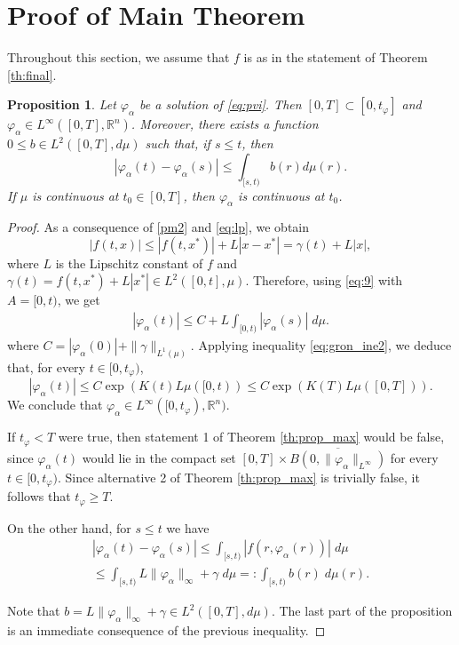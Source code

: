 \documentclass[a4paper,11pt]{amsart}
\theoremstyle{plain}
\newtheorem{prop}[thm]{Proposition}
\theoremstyle{remark}
\newcommand{\rr}{\mathbb{R}}
\numberwithin{equation}{section}
\begin{document}
 \section{Proof of Main Theorem} \label{sec:main_th}

Throughout this section, we assume that $f$ is as in the statement of Theorem \ref{th:final}.
  
\begin{prop}\label{corolario_continuidad}
     Let $\varphi_\alpha$ be a solution of \eqref{eq:pvi}. 
		Then $[0,T]\subset [0,t_{\varphi}]$ and $\varphi_{\alpha}\in L^\infty([0,T],\rr^n)$. Moreover, there exists a function $0\leq b\in L^2([0,T],d\mu)$ such that, if $s\leq t$, then
    \begin{equation*}\label{acotación}
        \left| \varphi_\alpha(t)-\varphi_\alpha(s)\right|\leq \int_{[s,t)}b(r)d\mu(r).
    \end{equation*}
If $\mu$ is continuous at $t_0\in [0,T]$, then $\varphi_\alpha$ is continuous at $t_0$.
\end{prop}

\begin{proof}
As a consequence of \ref{pm2} and \ref{eq:lp}, we obtain
\begin{equation}\label{eq:cota_f}
 |f(t,x)|\leq |f(t,x^*)|+L|x-x^*|=\gamma(t)+L|x|,
\end{equation}
where $L$ is the Lipschitz constant of $f$ and $\gamma(t)=f(t,x^*)+L|x^*|\in L^2([0,t],\mu)$. Therefore, using \eqref{eq:9} with $A=[0,t)$, we get
\begin{equation*}
\begin{split}
 	|\varphi_{\alpha}(t)|
     \leq C+L\int_{[0,t)}| \varphi_{\alpha}(s)|\;d\mu.
\end{split}
\end{equation*}
where $C=|\varphi_{\alpha}(0)|+\|\gamma\|_{L^1(\mu)}$. Applying inequality \eqref{eq:gron_ine2}, we deduce that, for every $t\in[0,t_{\varphi})$,
 \begin{equation*}
 	|\varphi_{\alpha}(t)|
	\leq C\exp\left(K(t)L\mu([0,t) \right)\leq C\exp\left(K(T)L\mu([0,T]) \right).
 \end{equation*}
We conclude that $\varphi_{\alpha}\in L^\infty([0,t_{\varphi}),\rr^n)$.

If $t_{\varphi}<T$ were true, then statement 1 of Theorem \ref{th:prop_max} would be false, since $\varphi_{\alpha}(t)$ would lie in the compact set $[0,T]\times \overline{B(0,\|\varphi_{\alpha}\|_{L^\infty})}$ for every $t\in[0,t_\varphi)$. Since alternative 2 of Theorem \ref{th:prop_max} is trivially false, it follows that $t_\varphi\geq T$.

On the other hand, for $s\leq t$ we have
  	\begin{multline*}
  		|\varphi_\alpha(t)-\varphi_\alpha(s)|\leq \int_{[s,t)}|f(r,\varphi_\alpha(r))|\;d\mu \\ \leq  \int_{[s,t)}L\|\varphi_\alpha\|_{\infty} + \gamma\;d\mu=:\int_{[s,t)}b(r)\;d \mu(r).
  	\end{multline*}

Note that $b=L\|\varphi_\alpha\|_{\infty} + \gamma\in L^2([0,T],d\mu)$. The last part of the proposition is an immediate consequence of the previous inequality.
\end{proof}
\end{document}
